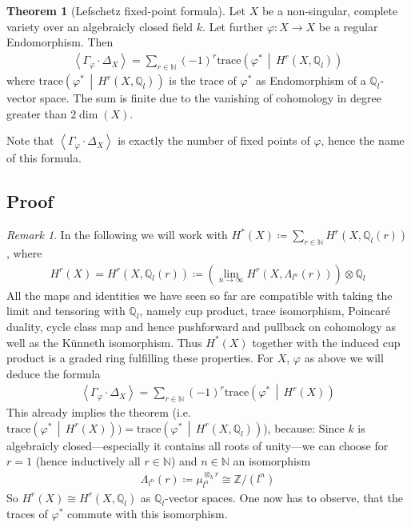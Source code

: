 \documentclass[english]{scrartcl}
\theoremstyle{definition}
\newtheorem{Thm}[Def]{Theorem}
\theoremstyle{remark}
\newtheorem{Rem}[Def]{Remark}
\newcommand*{\N}{\mathds{N}}
\newcommand*{\Z}{\mathds{Z}}
\newcommand*{\Q}{\mathds{Q}}
\newcommand*{\Zmod}[1]{\Z/#1} %
\newcommand*{\Zl}{\Z_l} %
\newcommand*{\Ql}{\Q_l} %
\newcommand*{\idest}{i.e.\ }
\newcommand*{\M}{\Lambda}
\newcommand*{\intProd}[2]{{#1\cdot#2}} %
\newcommand*{\intNum}[1]{{\left\langle{#1}\right\rangle}} %
\newcommand*{\Graph}[1]{{\Gamma_{#1}}} %
\newcommand*{\Diag}[1]{{\Delta_{#1}}} %
\newcommand*{\trace}[2]{{\text{trace}\left(#1 \,\middle|\, #2 \right)}} %
\renewcommand*{\phi}{\varphi}
\begin{document}
\begin{Thm}[Lefschetz fixed-point formula]\label{lefschetzthm}
  Let $X$ be a non-singular, complete variety over an algebraicly
  closed field $k$.
  Let further $\phi\colon X\to X$ be a regular Endomorphism.
  Then
  \begin{gather*}
    \intNum{\intProd{\Graph{\phi}}{\Diag{X}}}
    = \sum_{r\in\N} (-1)^r \trace{\phi^*}{H^r(X,\Ql)}
  \end{gather*}
  where $\trace{\phi^*}{H^r(X,\Ql)}$ is the trace of $\phi^*$ as
  Endomorphism of a $\Ql$-vector space. 
  The sum is finite due to the vanishing
  of cohomology in degree greater than $2\dim(X)$. 
\end{Thm}
Note that $\intNum{\intProd{\Graph{\phi}}{\Diag{X}}}$ is exactly the number of
fixed points of $\phi$, hence the name of this formula.


\subsection{Proof}
\begin{Rem}
  In the following we will work with
  $H^*(X)\coloneqq\sum_{r\in\N} H^r(X, \Ql(r))$, where
  \begin{gather*}
    H^r(X) = H^r(X,\Ql(r)) \coloneqq
    \left(\lim_{n\to\infty} H^r(X,\M_{l^n}(r))\right) \otimes \Ql
  \end{gather*}
  All the maps and identities we have seen so far are compatible with
  taking the limit and tensoring with $\Ql$, namely
  cup product,
  trace isomorphism,
  Poincaré duality,
  cycle class map and hence
  pushforward and pullback on cohomology as well as
  the Künneth isomorphism.
  Thus $H^*(X)$ together with the induced cup product is a graded ring
  fulfilling these properties.
  For $X$, $\phi$ as above we will deduce the formula
  \begin{gather*}
    \intNum{\intProd{\Graph{\phi}}{\Diag{X}}}
    = \sum_{r\in\N} (-1)^r \trace{\phi^*}{H^r(X)}
  \end{gather*}
  This already implies the theorem
  (\idest $\trace{\phi^*}{H^r(X)})=\trace{\phi^*}{H^r(X,\Ql)}$),
  because:
  Since $k$ is algebraicly closed---especially it contains all
  roots of unity---we can choose for $r=1$ (hence inductively all
  $r\in\N$) and $n\in\N$ an isomorphism
  \begin{gather*}
    \M_{l^n}(r)\coloneqq\mu_{l^n}^{\otimes_k r} \cong \Zmod{(l^n)}
  \end{gather*}
  So $H^r(X)\cong H^r(X,\Ql)$ as $\Ql$-vector spaces.
  One now has to observe, that the traces of $\phi^*$ commute with
  this isomorphism.
\end{Rem} 
\end{document}
